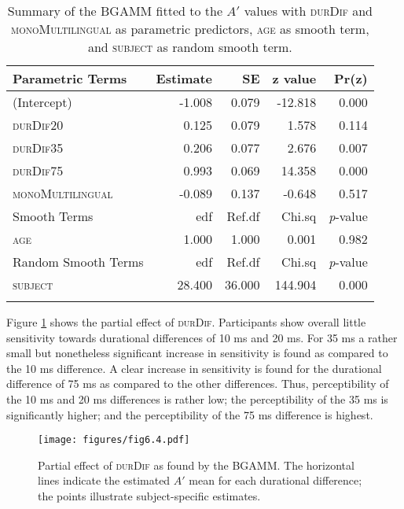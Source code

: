 \begin{table}\fontsize{10}{11}
\caption{Summary of the BGAMM fitted to the $A'$ values with \textsc{durDif} and \textsc{monoMultilingual} as parametric predictors, \textsc{age} as smooth term, and \textsc{subject} as random smooth term.}
\label{tab:6.11}
\centering
\begin{tabular}{lrrrr} 
\lsptoprule
Parametric Terms    & Estimate & SE     & z value & Pr(\textbar{}z\textbar{})  \\ 
\midrule
(Intercept)         & -1.008   & 0.079  & -12.818 & 0.000                      \\
\textsc{durDif20}            & 0.125    & 0.079  & 1.578   & 0.114                      \\
\textsc{durDif35}            & 0.206    & 0.077  & 2.676   & 0.007                      \\
\textsc{durDif75}            & 0.993    & 0.069  & 14.358  & 0.000                      \\
\textsc{monoMultilingual}    & -0.089   & 0.137  & -0.648  & 0.517                      \\ 
\midrule
Smooth Terms        & edf      & Ref.df & Chi.sq  & \textit{p}-value           \\ 
\midrule
\textsc{age}                 & 1.000    & 1.000  & 0.001   & 0.982                      \\ 
\midrule
Random Smooth Terms & edf      & Ref.df & Chi.sq  & \textit{p}-value           \\ 
\midrule
\textsc{subject}             & 28.400   & 36.000 & 144.904 & 0.000                      \\
\lspbottomrule
\end{tabular}
\end{table}

Figure \ref{fig:6_4} shows the partial effect of \textsc{durDif}. Participants show overall little sensitivity towards durational differences of 10 ms and 20 ms. For 35 ms a rather small but nonetheless significant increase in sensitivity is found as compared to the 10 ms difference. A clear increase in sensitivity is found for the durational difference of 75 ms as compared to the other differences. Thus, perceptibility of the 10 ms and 20 ms differences is rather low; the perceptibility of the 35 ms is significantly higher; and the perceptibility of the 75 ms difference is highest.

\begin{figure}
    \centering
    \texttt{[image: figures/fig6.4.pdf]}
    \caption{Partial effect of \textsc{durDif} as found by the BGAMM. The horizontal lines indicate the estimated $A'$ mean for each durational difference; the points illustrate subject-specific estimates.}
    \label{fig:6_4}
\end{figure}

